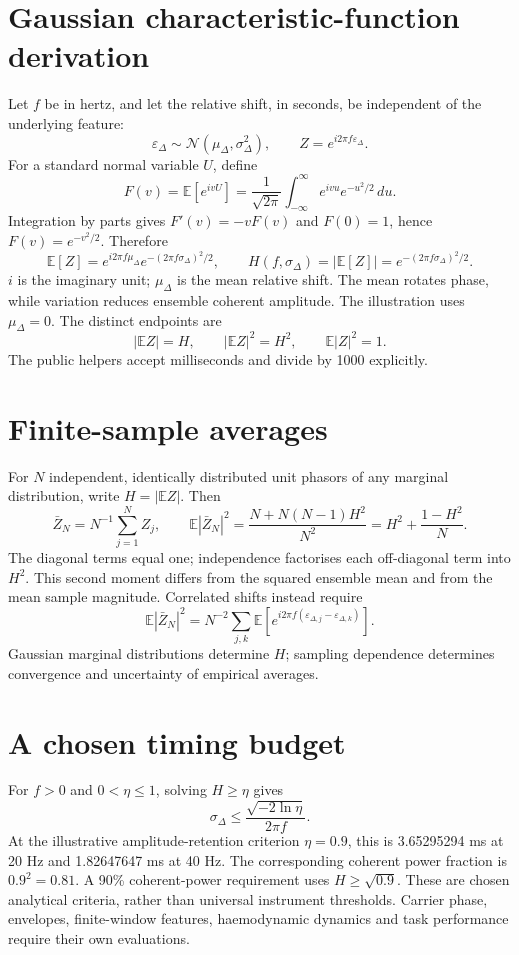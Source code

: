 \documentclass[11pt]{article}
\begin{document}
\section{Gaussian characteristic-function derivation}
Let $f$ be in hertz, and let the relative shift, in seconds, be independent of
the underlying feature:
\[
\varepsilon_\Delta\sim\mathcal N(\mu_\Delta,\sigma_\Delta^2),\qquad
Z=e^{i2\pi f\varepsilon_\Delta}.
\]
For a standard normal variable $U$, define
\[
F(v)=\mathbb E[e^{ivU}]
=\frac{1}{\sqrt{2\pi}}\int_{-\infty}^{\infty}e^{ivu}e^{-u^2/2}\,du.
\]
Integration by parts gives $F'(v)=-vF(v)$ and $F(0)=1$, hence
$F(v)=e^{-v^2/2}$. Therefore
\[
\mathbb E[Z]=e^{i2\pi f\mu_\Delta}
e^{-(2\pi f\sigma_\Delta)^2/2},\qquad
H(f,\sigma_\Delta)=|\mathbb E[Z]|
=e^{-(2\pi f\sigma_\Delta)^2/2}.
\]
$i$ is the imaginary unit; $\mu_\Delta$ is the mean relative shift. The mean
rotates phase, while variation reduces ensemble coherent amplitude. The
illustration uses $\mu_\Delta=0$. The distinct endpoints are
\[
|\mathbb E Z|=H,\qquad |\mathbb E Z|^2=H^2,\qquad
\mathbb E|Z|^2=1.
\]
The public helpers accept milliseconds and divide by 1000 explicitly.

\section{Finite-sample averages}
For $N$ independent, identically distributed unit phasors of any marginal
distribution, write $H=|\mathbb E Z|$. Then
\[
\bar Z_N=N^{-1}\sum_{j=1}^N Z_j,\qquad
\mathbb E|\bar Z_N|^2
=\frac{N+N(N-1)H^2}{N^2}
=H^2+\frac{1-H^2}{N}.
\]
The diagonal terms equal one; independence factorises each off-diagonal term
into $H^2$. This second moment differs from the squared ensemble mean and
from the mean sample magnitude. Correlated shifts instead require
\[
\mathbb E|\bar Z_N|^2
=N^{-2}\sum_{j,k}\mathbb E\!\left[
e^{i2\pi f(\varepsilon_{\Delta,j}-\varepsilon_{\Delta,k})}\right].
\]
Gaussian marginal distributions determine $H$; sampling dependence determines
convergence and uncertainty of empirical averages.

\section{A chosen timing budget}
For $f>0$ and $0<\eta\leq1$, solving $H\geq\eta$ gives
\[
\sigma_\Delta\leq\frac{\sqrt{-2\ln\eta}}{2\pi f}.
\]
At the illustrative amplitude-retention criterion $\eta=0.9$, this is
3.65295294 ms at 20 Hz and 1.82647647 ms at 40 Hz. The corresponding coherent
power fraction is $0.9^2=0.81$. A 90\% coherent-power requirement uses
$H\geq\sqrt{0.9}$. These are chosen analytical criteria, rather than universal
instrument thresholds. Carrier phase, envelopes, finite-window features,
haemodynamic dynamics and task performance require their own evaluations.
\end{document}
